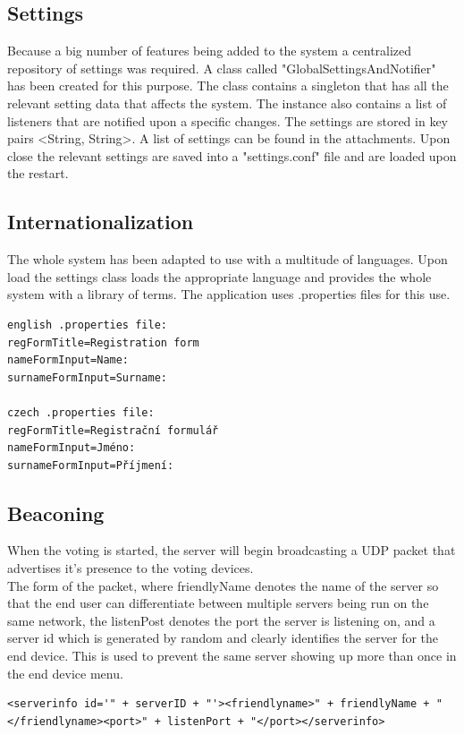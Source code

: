 \documentclass[11pt,twoside,a4paper]{book}
\begin{document}
\subsection{Settings}
Because a big number of features being added to the system a centralized repository of settings was required. A class called "GlobalSettingsAndNotifier" has been created for this purpose. The class contains a singleton that has all the relevant setting data that affects the system. The instance also contains a list of listeners that are notified upon a specific changes. The settings are stored in key pairs <String, String>. A list of settings can be found in the attachments. Upon close the relevant settings are saved into a "settings.conf" file and are loaded upon the restart.
\subsection{Internationalization}
The whole system has been adapted to use with a multitude of languages. Upon load the settings class loads the appropriate language and provides the whole system with a library of terms. The application uses .properties files for this use.



\begin{lstlisting}
english .properties file:
regFormTitle=Registration form
nameFormInput=Name:
surnameFormInput=Surname:

czech .properties file:
regFormTitle=Registrační formulář
nameFormInput=Jméno:
surnameFormInput=Příjmení:
\end{lstlisting}

\subsection{Beaconing}
When the voting is started, the server will begin broadcasting a UDP packet that advertises it's presence to the voting devices. \\

The form of the packet, where friendlyName denotes the name of the server so that the end user can differentiate between multiple servers being run on the same network, the listenPost denotes the port the server is listening on, and a server id which is generated by random and clearly identifies the server for the end device. This is used to prevent the same server showing up more than once in the end device menu.
\begin{lstlisting}
<serverinfo id='" + serverID + "'><friendlyname>" + friendlyName + "</friendlyname><port>" + listenPort + "</port></serverinfo>
\end{lstlisting}
\end{document}
